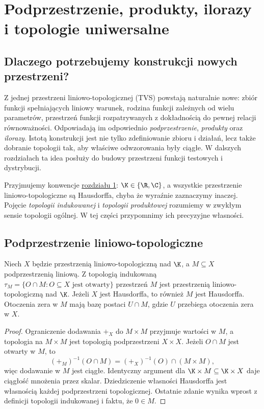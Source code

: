 \bigskip
\setcounter{section}{1}
\section{Podprzestrzenie, produkty, ilorazy i topologie uniwersalne}\label{sec:konstrukcje}

\subsection{Dlaczego potrzebujemy konstrukcji nowych przestrzeni?}

Z jednej przestrzeni liniowo-topologicznej (TVS) powstają naturalnie nowe:
zbiór funkcji spełniających liniowy warunek, rodzina funkcji zależnych
od wielu parametrów, przestrzeń funkcji rozpatrywanych z dokładnością
do pewnej relacji równoważności. Odpowiadają im odpowiednio
\emph{podprzestrzenie}, \emph{produkty} oraz \emph{ilorazy}.
Istotą konstrukcji jest nie tylko zdefiniowanie zbioru i działań,
lecz także dobranie topologii tak, aby właściwe odwzorowania były
ciągłe. W dalszych rozdziałach ta idea posłuży do budowy
przestrzeni funkcji testowych i dystrybucji.

Przyjmujemy konwencje \hyperref[sec:tvs]{rozdziału 1}: $\K\in\{\R,\C\}$,
a wszystkie przestrzenie liniowo-topologiczne są Hausdorffa,
chyba że wyraźnie zaznaczymy inaczej. Pojęcie \emph{topologii
indukowanej} i \emph{topologii produktowej} rozumiemy w zwykłym sensie
topologii ogólnej. W tej części przypomnimy ich precyzyjne własności.

\subsection{Podprzestrzenie liniowo-topologiczne}

\begin{twierdzenie}\label{thm:subspace-tvs}
Niech $X$ będzie przestrzenią liniowo-topologiczną nad $\K$,
a $M\subseteq X$ podprzestrzenią liniową. Z topologią indukowaną
$\tau_M=\{O\cap M:O\subseteq X\text{ jest otwarty}\}$
przestrzeń $M$ jest przestrzenią liniowo-topologiczną nad $\K$.
Jeżeli $X$ jest Hausdorffa, to również $M$ jest Hausdorffa.
Otoczenia zera w $M$ mają bazę postaci $U\cap M$, gdzie
$U$ przebiega otoczenia zera w $X$.
\end{twierdzenie}
\begin{proof}
Ograniczenie dodawania $+_X$ do $M\times M$ przyjmuje wartości
w $M$, a topologia na $M\times M$ jest topologią podprzestrzeni
$X\times X$. Jeżeli $O\cap M$ jest otwarty w $M$, to
\[
 (+_M)^{-1}(O\cap M)=(+_X)^{-1}(O)\cap(M\times M),
\]
więc dodawanie w $M$ jest ciągłe. Identyczny argument dla
$\K\times M\subseteq\K\times X$ daje ciągłość mnożenia
przez skalar. Dziedziczenie własności Hausdorffa jest własnością
każdej podprzestrzeni topologicznej. Ostatnie zdanie wynika
wprost z definicji topologii indukowanej i faktu, że $0\in M$.
\end{proof}

